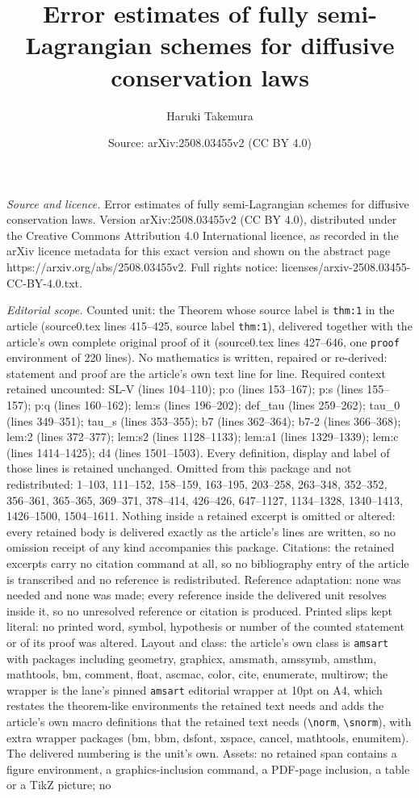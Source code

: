 \documentclass[10pt,a4paper]{amsart}
\title[Error estimates of fully semi-Lagrangian schemes for diffusi]{Error estimates of fully semi-Lagrangian schemes for diffusive conservation laws}
\author{Haruki Takemura}
\date{Source: arXiv:2508.03455v2 (CC BY 4.0)}
\begin{document}
\maketitle

\noindent\emph{Source and licence.} Error estimates of fully semi-Lagrangian schemes for diffusive conservation laws. Version arXiv:2508.03455v2 (CC BY 4.0), distributed under the Creative Commons Attribution 4.0 International licence, as recorded in the arXiv licence metadata for this exact version and shown on the abstract page https://arxiv.org/abs/2508.03455v2. Full rights notice: licenses/arxiv-2508.03455-CC-BY-4.0.txt.\par\smallskip

\noindent\textit{Editorial scope.} Counted unit: the Theorem whose source label is \texttt{thm:1} in the article (source0.tex lines 415--425, source label \texttt{thm:1}), delivered together with the article's own complete original proof of it (source0.tex lines 427--646, one \texttt{proof} environment of 220 lines). No mathematics is written, repaired or re-derived: statement and proof are the article's own text line for line. Required context retained uncounted: SL-V (lines 104--110); p:o (lines 153--167); p:s (lines 155--157); p:q (lines 160--162); lem:s (lines 196--202); def\_tau (lines 259--262); tau\_0 (lines 349--351); tau\_s (lines 353--355); b7 (lines 362--364); b7-2 (lines 366--368); lem:2 (lines 372--377); lem:s2 (lines 1128--1133); lem:a1 (lines 1329--1339); lem:c (lines 1414--1425); d4 (lines 1501--1503). Every definition, display and label of those lines is retained unchanged. Omitted from this package and not redistributed: 1--103, 111--152, 158--159, 163--195, 203--258, 263--348, 352--352, 356--361, 365--365, 369--371, 378--414, 426--426, 647--1127, 1134--1328, 1340--1413, 1426--1500, 1504--1611. Nothing inside a retained excerpt is omitted or altered: every retained body is delivered exactly as the article's lines are written, so no omission receipt of any kind accompanies this package. Citations: the retained excerpts carry no citation command at all, so no bibliography entry of the article is transcribed and no reference is redistributed. Reference adaptation: none was needed and none was made; every reference inside the delivered unit resolves inside it, so no unresolved reference or citation is produced. Printed slips kept literal: no printed word, symbol, hypothesis or number of the counted statement or of its proof was altered. Layout and class: the article's own class is \texttt{amsart} with packages including geometry, graphicx, amsmath, amssymb, amsthm, mathtools, bm, comment, float, ascmac, color, cite, enumerate, multirow; the wrapper is the lane's pinned \texttt{amsart} editorial wrapper at 10pt on A4, which restates the theorem-like environments the retained text needs and adds the article's own macro definitions that the retained text needs (\texttt{\textbackslash norm}, \texttt{\textbackslash snorm}), with extra wrapper packages (bm, bbm, dsfont, xspace, cancel, mathtools, enumitem). The delivered numbering is the unit's own. Assets: no retained span contains a figure environment, a graphics-inclusion command, a PDF-page inclusion, a table or a TikZ picture; no 
\end{document}

